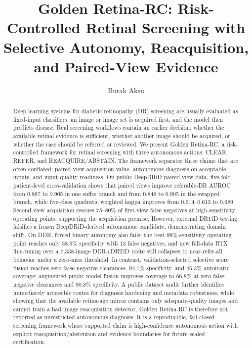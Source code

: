 \documentclass[journal]{IEEEtran}
\title{Golden Retina-RC: Risk-Controlled Retinal Screening with Selective Autonomy, Reacquisition, and Paired-View Evidence}
\author{Burak Aksu}
\begin{document}
\maketitle

\begin{abstract}
Deep learning systems for diabetic retinopathy (DR) screening are usually evaluated as fixed-input classifiers: an image or image set is acquired first, and the model then predicts disease. Real screening workflows contain an earlier decision: whether the available retinal evidence is sufficient, whether another image should be acquired, or whether the case should be referred or reviewed. We present Golden Retina-RC, a risk-controlled framework for retinal screening with three autonomous actions: CLEAR, REFER, and REACQUIRE/ABSTAIN. The framework separates three claims that are often conflated: paired-view acquisition value, autonomous diagnosis on acceptable inputs, and input-quality readiness. On public DeepDRiD paired-view data, five-fold patient-level cross-validation shows that paired views improve referable-DR AUROC from 0.887 to 0.905 in one suffix branch and from 0.848 to 0.905 in the swapped branch, while five-class quadratic weighted kappa improves from 0.614--0.613 to 0.689. Second-view acquisition rescues 75--80\% of first-view false negatives at high-sensitivity operating points, supporting the acquisition premise. However, external DRTiD testing falsifies a frozen DeepDRiD-derived autonomous candidate, demonstrating domain shift. On DDR, forced binary autonomy also fails: the best 99\%-sensitivity operating point reaches only 38.9\% specificity with 13 false negatives, and new full-data RTX fine-tuning over a 7,338-image DDR+DRTiD route still collapses to near-refer-all behavior under a zero-miss threshold. In contrast, validation-selected selective score fusion reaches zero false-negative clearances, 94.7\% specificity, and 46.3\% automatic coverage; augmented public-model fusion improves coverage to 66.8\% at zero false-negative clearances and 90.8\% specificity. A public dataset audit further identifies immediately accessible routes for diagnosis hardening and metadata robustness, while showing that the available retina-age mirror contains only adequate-quality images and cannot train a bad-image reacquisition detector. Golden Retina-RC is therefore not reported as unrestricted autonomous diagnosis. It is a reproducible, fail-closed screening framework whose supported claim is high-confidence autonomous action with explicit reacquisition/abstention and evidence boundaries for future sealed certification.
\end{abstract}
\end{document}
